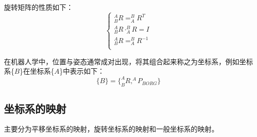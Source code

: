 \documentclass{seuthesis-2022}
\numberwithin{equation}{section}
\begin{document}
旋转矩阵的性质如下：
\begin{equation}
\begin{cases}
  ^{A}_{B}R = ^{B}_{A}R^{T}\\
  ^{A}_{B}R \cdot ^{B}_{A}R = I\\
  ^{A}_{B}R = ^{B}_{A}R^{-1}\\
\end{cases}
\end{equation}

在机器人学中，位置与姿态通常成对出现，将其组合起来称之为坐标系，例如坐标系\{$B$\}在坐标系\{$A$\}中表示如下：
\begin{equation}
\{B\}=\{^{A}_{B}R,^{A}P_{BORG}\}
\end{equation}

\subsection{坐标系的映射}
主要分为平移坐标系的映射，旋转坐标系的映射和一般坐标系的映射。
\end{document}
